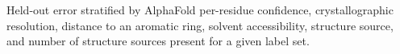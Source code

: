 Held-out error stratified by AlphaFold per-residue confidence, crystallographic resolution, distance to an aromatic ring, solvent accessibility, structure source, and number of structure sources present for a given label set.
